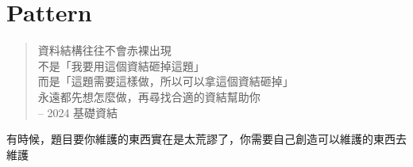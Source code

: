 \section{Pattern}

\begin{frame}{\ebtitle}
    \begin{quote}
        資料結構往往不會赤裸出現 \\
    
        不是「我要用這個資結砸掉這題」\\
        而是「這題需要這樣做，所以可以拿這個資結砸掉」\\
        永遠都先想怎麼做，再尋找合適的資結幫助你 \\

        -- 2024 基礎資結
    \end{quote}

     {
        有時候，題目要你維護的東西實在是太荒謬了，你需要自己創造可以維護的東西去維護
    }
\end{frame}

